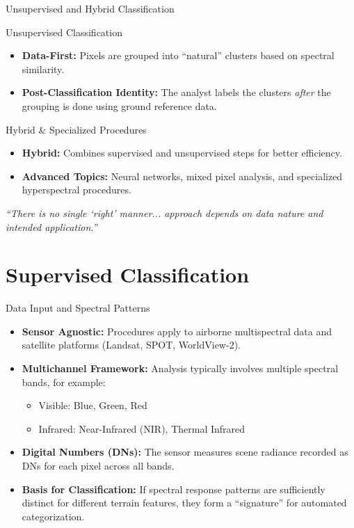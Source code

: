\documentclass[aspectratio=169]{beamer}
\begin{document}
\begin{frame}{Unsupervised and Hybrid Classification}
    \begin{block}{Unsupervised Classification}
        \begin{itemize}
            \item \textbf{Data-First:} Pixels are grouped into ``natural'' clusters based on spectral similarity.
            \item \textbf{Post-Classification Identity:} The analyst labels the clusters \textit{after} the grouping is done using ground reference data.
        \end{itemize}
    \end{block}

    \begin{block}{Hybrid \& Specialized Procedures}
        \begin{itemize}
            \item \textbf{Hybrid:} Combines supervised and unsupervised steps for better efficiency.
            \item \textbf{Advanced Topics:} Neural networks, mixed pixel analysis, and specialized hyperspectral procedures.
        \end{itemize}
    \end{block}

    \centering
    \small \textit{``There is no single `right' manner... approach depends on data nature and intended application.''}
\end{frame}

\section{Supervised Classification}

\begin{frame}{Data Input and Spectral Patterns}
    \begin{itemize}
        \item \textbf{Sensor Agnostic:} Procedures apply to airborne multispectral data and satellite platforms (Landsat, SPOT, WorldView-2).
        \item \textbf{Multichannel Framework:} Analysis typically involves multiple spectral bands, for example:
        \begin{itemize}
            \item Visible: Blue, Green, Red
            \item Infrared: Near-Infrared (NIR), Thermal Infrared
        \end{itemize}
        \item \textbf{Digital Numbers (DNs):} The sensor measures scene radiance recorded as DNs for each pixel across all bands.
        \item \textbf{Basis for Classification:} If spectral response patterns are sufficiently distinct for different terrain features, they form a ``signature'' for automated categorization.
    \end{itemize}
\end{frame}
\end{document}
